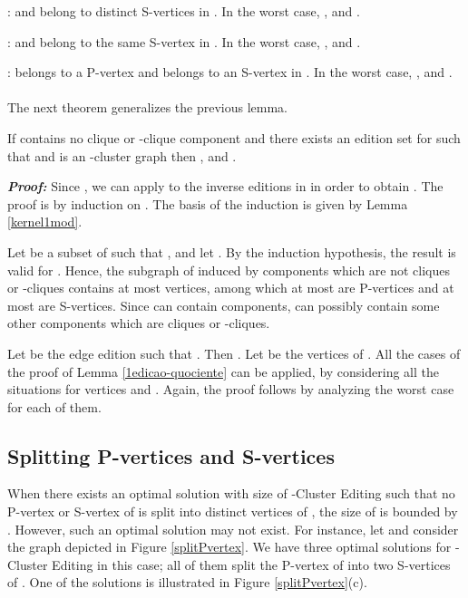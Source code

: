 \documentclass[12pt]{article}
\begin{document}
\medskip

:  and  belong to distinct S-vertices in . In the worst case, ,    and .

\medskip

:  and  belong to the same S-vertex in . In the worst case, ,  and .

\medskip

:  belongs to a P-vertex and  belongs to an S-vertex in . In the worst case, ,  and .
\hfill \framebox[.09in] \\ \\

The next theorem generalizes the previous lemma.

\begin{teo} \label{sizeG_Q}
If  contains no clique or -clique component and there
exists an edition set  for  such that  and
 is an -cluster graph then , 
and .
\end{teo}

\emph{\textbf{Proof:}} Since , we can apply to  the inverse
editions in  in order to obtain . The proof is by induction on .
The basis of the induction is given by Lemma \ref{kernel1mod}.

Let  be a subset of  such that , and let
. By the induction hypothesis, the result is
valid for . Hence, the subgraph of 
induced by components which are not cliques or -cliques
contains at most  vertices, among which at most
 are P-vertices and at most  are S-vertices.
Since  can contain  components, 
can possibly contain some other components which are cliques or
-cliques.

Let  be the edge edition such that . Then . Let  be the vertices
of . All the cases of the proof of Lemma
\ref{1edicao-quociente} can be applied, by considering all the situations
for vertices  and . Again, the proof follows by analyzing the worst case for each of them. \hfill \framebox[.09in]


\subsection{Splitting P-vertices and S-vertices}

When there exists an optimal solution with size  of {\sc -Cluster Editing}
such that no P-vertex or S-vertex  of  is
split into distinct vertices of ,
the size of  is bounded by  \cite{DSPS2006,DSPS2009}.
However, such an optimal solution may not exist.
For instance, let  and consider the graph  depicted in Figure \ref{splitPvertex}. We have
three optimal solutions for {\sc -Cluster Editing} in this case; all of
them split the P-vertex  of  into two S-vertices
of . One of the solutions is illustrated in Figure \ref{splitPvertex}(c).
\end{document}
